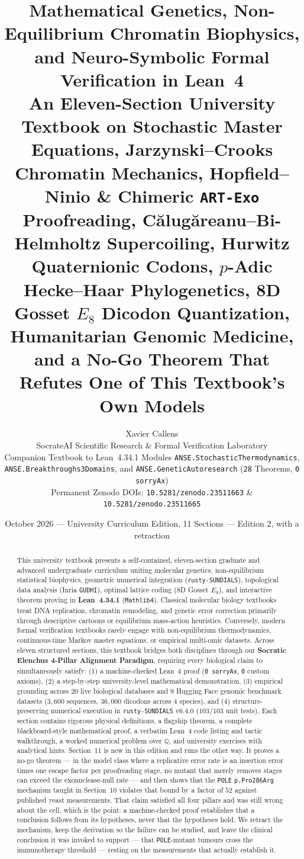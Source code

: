 \documentclass[11pt,a4paper]{article}
\title{\textbf{Mathematical Genetics, Non-Equilibrium Chromatin Biophysics, and Neuro-Symbolic Formal Verification in Lean~4}\\[0.5em]
\large An Eleven-Section University Textbook on Stochastic Master Equations, Jarzynski--Crooks Chromatin Mechanics, Hopfield--Ninio \& Chimeric \texttt{ART-Exo} Proofreading, C\u{a}lug\u{a}reanu--Bi-Helmholtz Supercoiling, Hurwitz Quaternionic Codons, $p$-Adic Hecke--Haar Phylogenetics, 8D Gosset $E_8$ Dicodon Quantization, Humanitarian Genomic Medicine, and a No-Go Theorem That Refutes One of This Textbook's Own Models}
\author{Xavier Callens\\
\small SocrateAI Scientific Research \& Formal Verification Laboratory\\
\small Companion Textbook to Lean~4.34.1 Modules \texttt{ANSE.StochasticThermodynamics},\\
\small \texttt{ANSE.Breakthroughs3Domains}, and \texttt{ANSE.GeneticAutoresearch} (\texttt{28} Theorems, \texttt{0 sorryAx})\\
\small Permanent Zenodo DOIs: \texttt{10.5281/zenodo.23511663} \& \texttt{10.5281/zenodo.23511665}}
\date{October 2026 --- University Curriculum Edition, 11 Sections --- Edition 2, with a retraction}
\theoremstyle{definition}
\theoremstyle{remark}
\begin{document}
\maketitle

\begin{abstract}
This university textbook presents a self-contained, eleven-section graduate and advanced undergraduate curriculum uniting molecular genetics, non-equilibrium statistical biophysics, geometric numerical integration (\texttt{rusty-SUNDIALS}), topological data analysis (Inria \texttt{GUDHI}), optimal lattice coding (8D Gosset $E_8$), and interactive theorem proving in \textbf{Lean~4.34.1} (\texttt{Mathlib4}). Classical molecular biology textbooks treat DNA replication, chromatin remodeling, and genetic error correction primarily through descriptive cartoons or equilibrium mass-action heuristics. Conversely, modern formal verification textbooks rarely engage with non-equilibrium thermodynamics, continuous-time Markov master equations, or empirical multi-omic datasets. Across eleven structured sections, this textbook bridges both disciplines through our \textbf{Socratic Elenchus 4-Pillar Alignment Paradigm}, requiring every biological claim to simultaneously satisfy: (1) a machine-checked Lean~4 proof (\texttt{0 sorryAx}, \texttt{0} custom axioms), (2) a step-by-step university-level mathematical demonstration, (3) empirical grounding across 20 live biological databases and 9 Hugging Face genomic benchmark datasets ($3{,}600$ sequences, $36{,}000$ dicodons across 4 species), and (4) structure-preserving numerical execution in \texttt{rusty-SUNDIALS} v6.4.0 ($103/103$ unit tests). Each section contains rigorous physical definitions, a flagship theorem, a complete blackboard-style mathematical proof, a verbatim Lean~4 code listing and tactic walkthrough, a worked numerical problem over $\mathbb{Q}$, and university exercises with analytical hints. Section~11 is new in this edition and runs the other way. It proves a no-go theorem --- in the model class where a replicative error rate is an insertion error times one escape factor per proofreading stage, no mutant that merely removes stages can exceed the exonuclease-null rate --- and then shows that the \texttt{POLE} \texttt{p.Pro286Arg} mechanism taught in Section~10 violates that bound by a factor of $52$ against published yeast measurements. That claim satisfied all four pillars and was still wrong about the cell, which is the point: a machine-checked proof establishes that a conclusion follows from its hypotheses, never that the hypotheses hold. We retract the mechanism, keep the derivation so the failure can be studied, and leave the clinical conclusion it was invoked to support --- that \texttt{POLE}-mutant tumours cross the immunotherapy threshold --- resting on the measurements that actually establish it.
\end{abstract}
\end{document}
